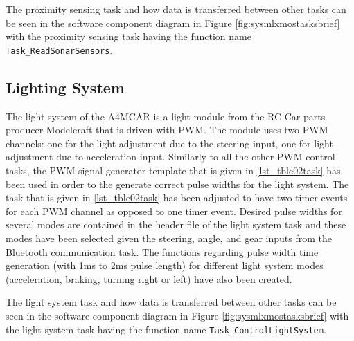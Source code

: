 The proximity sensing task and how data is transferred between other tasks can be seen in the software component diagram in Figure \ref{fig:sysmlxmostasksbrief} with the proximity sensing task having the function name \texttt{Task\texttt{\_}ReadSonarSensors}.



\subsection{Lighting System}
The light system of the A4MCAR is a light module from the RC-Car parts producer Modelcraft that is driven with PWM. The module uses two PWM channels: one for the light adjustment due to the steering input, one for light adjustment due to acceleration input. Similarly to all the other PWM control tasks, the PWM signal generator template that is given in \ref{lst_tble02task} has been used in order to the generate correct pulse widths for the light system. The task that is given in \ref{lst_tble02task} has been adjusted to have two timer events for each PWM channel as opposed to one timer event. Desired pulse widths for several modes are contained in the header file of the light system task and these modes have been selected given the steering, angle, and gear inputs from the Bluetooth communication task. The functions regarding pulse width time generation (with 1ms to 2ms pulse length) for different light system modes (acceleration, braking, turning right or left) have also been created. 

The light system task and how data is transferred between other tasks can be seen in the software component diagram in Figure \ref{fig:sysmlxmostasksbrief} with the light system task having the function name \texttt{Task\texttt{\_}ControlLightSystem}.

